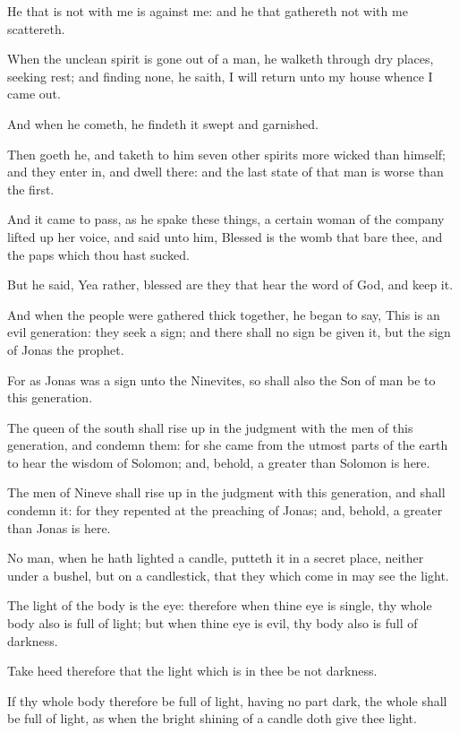 \Verse He that is not with me is against me: and he that gathereth not with me scattereth.

\Verse When the unclean spirit is gone out of a man, he walketh through dry places, seeking rest; and finding none, he saith, I will return unto my house whence I came out.

\Verse And when he cometh, he findeth it swept and garnished.

\Verse Then goeth he, and taketh to him seven other spirits more wicked than himself; and they enter in, and dwell there: and the last state of that man is worse than the first.

\Verse And it came to pass, as he spake these things, a certain woman of the company lifted up her voice, and said unto him, Blessed is the womb that bare thee, and the paps which thou hast sucked.

\Verse But he said, Yea rather, blessed are they that hear the word of God, and keep it.

\Verse And when the people were gathered thick together, he began to say, This is an evil generation: they seek a sign; and there shall no sign be given it, but the sign of Jonas the prophet.

\Verse For as Jonas was a sign unto the Ninevites, so shall also the Son of man be to this generation.

\Verse The queen of the south shall rise up in the judgment with the men of this generation, and condemn them: for she came from the utmost parts of the earth to hear the wisdom of Solomon; and, behold, a greater than Solomon is here.

\Verse The men of Nineve shall rise up in the judgment with this generation, and shall condemn it: for they repented at the preaching of Jonas; and, behold, a greater than Jonas is here.

\Verse No man, when he hath lighted a candle, putteth it in a secret place, neither under a bushel, but on a candlestick, that they which come in may see the light.

\Verse The light of the body is the eye: therefore when thine eye is single, thy whole body also is full of light; but when thine eye is evil, thy body also is full of darkness.

\Verse Take heed therefore that the light which is in thee be not darkness.

\Verse If thy whole body therefore be full of light, having no part dark, the whole shall be full of light, as when the bright shining of a candle doth give thee light.

